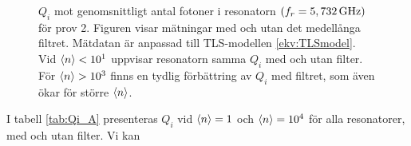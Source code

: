 \documentclass[main.tex]{subfiles}
\begin{document}
\begin{figure}[H]
  \centering
  \setlength{}
  \setlength\figureheight{12em}
  
  \caption{$Q_i$ mot genomsnittligt antal fotoner i resonatorn $(f_r=\unit[5,732]{GHz})$ för prov 2. Figuren visar mätningar med och utan det medellånga filtret. Mätdatan är anpassad till TLS-modellen \eqref{ekv:TLSmodel}. Vid $\expval{n}<10^1$ uppvisar resonatorn samma $Q_i$ med och utan filter. För $\expval{n}>10^3$ finns en tydlig förbättring av $Q_i$ med filtret, som även ökar för större $\expval{n}$.}
  \label{fig:Qi_n}
\end{figure}

I tabell \ref{tab:Qi_A} presenteras $Q_i$ vid $\expval{n}=1$ och $\expval{n}=10^4$ för alla resonatorer, med och utan filter. Vi kan
\end{document}
